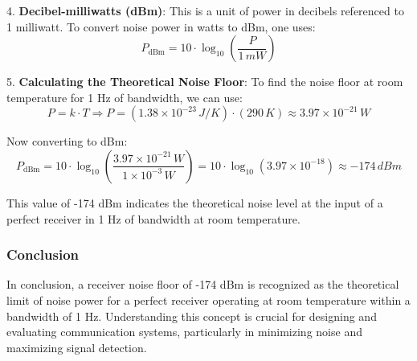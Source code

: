 4. \textbf{Decibel-milliwatts (dBm)}: This is a unit of power in decibels referenced to 1 milliwatt. To convert noise power in watts to dBm, one uses:
   \[
   P_{\text{dBm}} = 10 \cdot \log_{10} \left( \frac{P}{1 \, mW} \right) 
   \]

5. \textbf{Calculating the Theoretical Noise Floor}: To find the noise floor at room temperature for 1 Hz of bandwidth, we can use:
   \[
   P = k \cdot T \Rightarrow P = (1.38 \times 10^{-23} \, J/K) \cdot (290 \, K) \approx 3.97 \times 10^{-21} \, W
   \]

   Now converting to dBm:
   \[
   P_{\text{dBm}} = 10 \cdot \log_{10} \left( \frac{3.97 \times 10^{-21} \, W}{1 \times 10^{-3} \, W} \right) = 10 \cdot \log_{10} (3.97 \times 10^{-18}) \approx -174 \, dBm
   \]

   This value of -174 dBm indicates the theoretical noise level at the input of a perfect receiver in 1 Hz of bandwidth at room temperature.

\subsubsection{Conclusion}

In conclusion, a receiver noise floor of -174 dBm is recognized as the theoretical limit of noise power for a perfect receiver operating at room temperature within a bandwidth of 1 Hz. Understanding this concept is crucial for designing and evaluating communication systems, particularly in minimizing noise and maximizing signal detection.